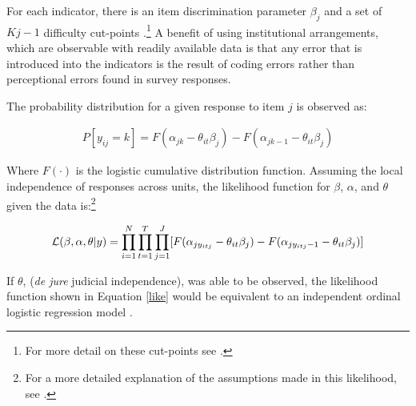 \documentclass[12pt]{article}
\begin{document}
For each indicator, there is an item discrimination parameter $\beta_j$ and a set of $Kj-1$ difficulty cut-points \citep[7]{Schnakenberg2014}.\footnote{For more detail on these cut-points see \citet{Treier2008,Schnakenberg2014}.}  A benefit of using institutional arrangements, which are observable with readily available data is that any error that is introduced into the indicators is the result of coding errors rather than perceptional errors found in survey responses.  

The probability distribution for a given response to item $j$ is observed as:

\begin{align}
P[y_{ij}=k]=F(\alpha_{jk}-\theta_{it}\beta_j)-F(\alpha_{jk-1}-\theta_{it}\beta_j)
\end{align} 

Where $F(\cdot)$ is the logistic cumulative distribution function.  Assuming the local independence of responses across units, the likelihood function for $\beta$, $\alpha$, and $\theta$ given the data is:\footnote{For a more detailed explanation of the assumptions made in this likelihood, see \citet[8]{Schnakenberg2014}.}

\begin{align}\label{like}
{\cal L} (\beta,\alpha,\theta|y)=\prod_{i=1}^{N}\prod_{t=1}^{T}\prod_{j=1}^{J}[F(\alpha_{jy_{itj}}-\theta_{it}\beta_j)-F(\alpha_{jy_{itj}-1}-\theta_{it}\beta_j)]
\end{align} 

If $\theta$, (\textit{de jure} judicial independence), was able to be observed, the likelihood function shown in Equation \ref{like} would be equivalent to an independent ordinal logistic regression model \citep[8]{Schnakenberg2014}.  
\end{document}

